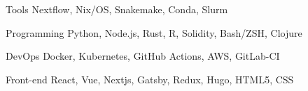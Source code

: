 
\begin{cvskills}

	\cvskill
	{Tools} %
	{Nextflow, Nix/OS, Snakemake, Conda, Slurm} %

	\cvskill
	{Programming} %
	{Python, Node.js, Rust, R, Solidity, Bash/ZSH, Clojure} %

	\cvskill
	{DevOps} %
	{Docker, Kubernetes, GitHub Actions, AWS, GitLab-CI} %

	\cvskill
	{Front-end} %
	{React, Vue, Nextjs, Gatsby, Redux, Hugo, HTML5, CSS} %

	\cvskill


\end{cvskills}
